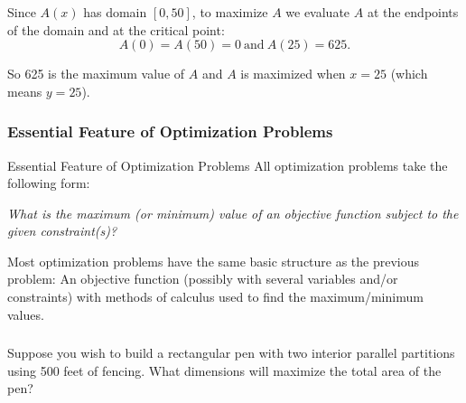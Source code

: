 \documentclass[cal1spr16Lectures.tex]{subfiles}
\begin{document}
\begin{frame}
\frametitle{}
Since $A(x)$ has domain $[0,50]$, to maximize $A$ we evaluate $A$ \alert{at the endpoints of the domain and at the critical point}:
\[A(0)=A(50)=0\ \text{and}\ A(25)=625.\]

\vspace{2pc}
So 625 is the maximum value of $A$ and $A$ is maximized when $x=25$ (which means $y=25$).
\end{frame}

\subsubsection{Essential Feature of Optimization Problems}

\begin{frame}{\small Essential Feature of Optimization Problems}
\small
All optimization problems take the following form:
\begin{center}
\alert{\it What is the maximum (or minimum) value of an objective function subject to the given constraint(s)?}
\end{center}

\vspace{2pc}
Most optimization problems have the same basic structure as the previous problem:  An objective function (possibly with several variables and/or constraints) with methods of calculus used to find the maximum/minimum values.
\end{frame}

\begin{frame}
\frametitle{}
\small
\begin{exe} Suppose you wish to build a rectangular pen with two interior parallel partitions using 500 feet of fencing.  What dimensions will maximize the total area of the pen?
\begin{center}
\end{center}
\end{exe}
\end{frame}
\end{document}

